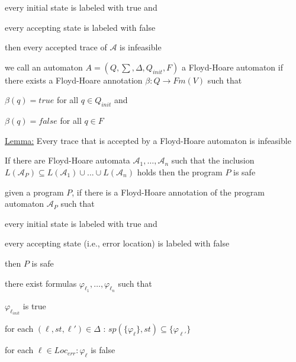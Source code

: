 \documentclass[landscape, a4paper]{article}
\begin{document}
\begin{minipage}[t]{0.2\linewidth}
\begin{betterlist}
		\begin{betterlist}
			\item every initial state is labeled with true and
			\item every accepting state is labeled with false
		\end{betterlist}
		then every accepted trace of $\mathcal{A}$ is infeasible\color{black}
		\item \color{orange}we call an automaton $A = (Q, \sum , \Delta , Q_{init}, F)$ a \alert{Floyd-Hoare automaton} if there exists a Floyd-Hoare annotation $\beta  : Q \rightarrow Fm(V)$ such that
		\begin{betterlist}
			\item $\beta(q) = true$ for all $q \in Q_{init}$ and
			\item $\beta(q) = false$ for all $q \in F$
		\end{betterlist}\color{black}
		\item \underline{Lemma:} Every trace that is accepted by a Floyd-Hoare automaton is infeasible
		\item If there are Floyd-Hoare automata $\mathcal{A}_{1}, \ldots, \mathcal{A}_{n}$ such that the inclusion $L(\mathcal{A}_P) \subseteq L(\mathcal{A}_{1}) \cup . . . \cup L(\mathcal{A}_{n})$ holds then the program $P$ is safe
	\end{betterlist}
	\begin{betterlist}
		\item \color{violet}given a program $P$, if there is a Floyd-Hoare annotation of the program automaton $\mathcal{A}_P$ such that
		\begin{betterlist}
			\item every initial state is labeled with true and
			\item every accepting state (i.e., error location) is labeled with false
		\end{betterlist}
		then $P$ is safe\color{black}
		\begin{betterlist}
			\item there exist formulas $\varphi_{\ell_1},\ldots , \varphi_{\ell_n}$ such that
			\begin{betterlist}
				\item $\varphi_{\ell_{init}}$ is true
				\item for each $(\ell , st, \ell ' ) \in \Delta$ : $sp(\{ \varphi_{\ell} \} , st) \subseteq \{ \varphi_{\ell'}\}$
				\item for each $\ell \in Loc_{err} : \varphi_{\ell}$ is false

\end{betterlist}
\end{betterlist}
\end{betterlist}
\end{minipage}
\end{document}
